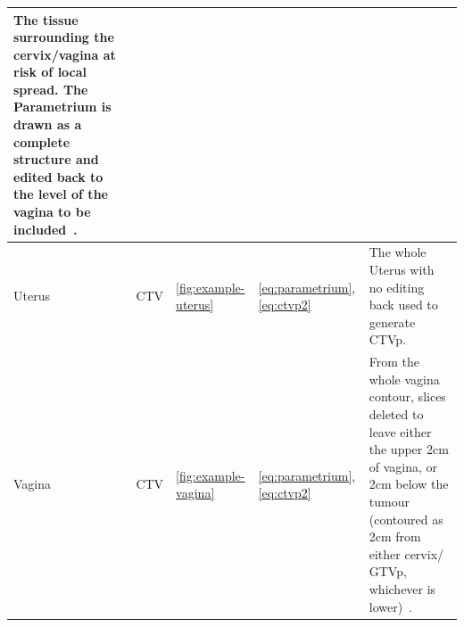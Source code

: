 \documentclass[11pt,twoside]{report}
\begin{document}
\begin{landscape}
\begin{table}[h!]
\begin{tabularx}{\linewidth}{l l l l X}
      The tissue surrounding the cervix/vagina at risk of local spread. The Parametrium is drawn as a complete structure and edited back to the level of the vagina to be included~\cite{AMLART-data}. \\
      \midrule
      Uterus & CTV & \ref{fig:example-uterus} & \ref{eq:parametrium}, \ref{eq:ctvp2} & The whole Uterus with no editing back used to generate CTVp. \\
      \midrule
      Vagina & CTV & \ref{fig:example-vagina} & \ref{eq:parametrium}, \ref{eq:ctvp2} & From the whole vagina contour, slices deleted to leave either the upper 2cm of vagina, or 2cm below the tumour (contoured as 2cm from either cervix/ GTVp, whichever is lower)~\cite{AMLART-data}. \\
      \bottomrule
    \end{tabularx}
  \end{table}
  

\end{landscape}
\end{document}
